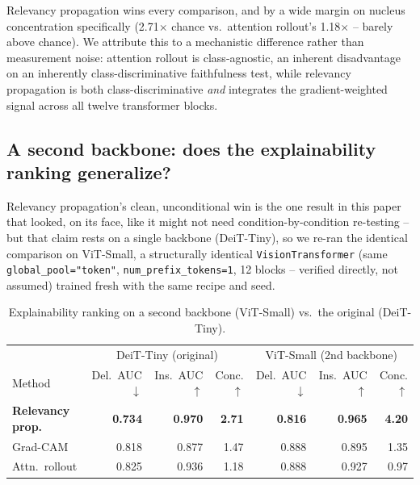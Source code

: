 \documentclass[runningheads]{llncs}
\begin{document}
Relevancy propagation wins every comparison, and by a wide margin on
nucleus concentration specifically (2.71$\times$ chance vs.\ attention
rollout's 1.18$\times$ -- barely above chance). We attribute this to a
mechanistic difference rather than measurement noise: attention rollout
is class-agnostic, an inherent disadvantage on an inherently
class-discriminative faithfulness test, while relevancy propagation is
both class-discriminative \emph{and} integrates the gradient-weighted
signal across all twelve transformer blocks.

\subsection{A second backbone: does the explainability ranking generalize?}

Relevancy propagation's clean, unconditional win is the one result in
this paper that looked, on its face, like it might not need
condition-by-condition re-testing -- but that claim rests on a single
backbone (DeiT-Tiny), so we re-ran the identical comparison on ViT-Small,
a structurally identical \texttt{VisionTransformer} (same
\texttt{global\_pool="token"}, \texttt{num\_prefix\_tokens=1}, 12 blocks
-- verified directly, not assumed) trained fresh with the same recipe and
seed.

\begin{table}[htbp]
\centering
\caption{Explainability ranking on a second backbone (ViT-Small) vs.\ the original (DeiT-Tiny).}
\label{tab:rq3-vit-small}
\begin{tabular}{lrrrrrr}
\toprule
 & \multicolumn{3}{c}{DeiT-Tiny (original)} & \multicolumn{3}{c}{ViT-Small (2nd backbone)} \\
Method & Del.\ AUC$\downarrow$ & Ins.\ AUC$\uparrow$ & Conc.$\uparrow$ & Del.\ AUC$\downarrow$ & Ins.\ AUC$\uparrow$ & Conc.$\uparrow$ \\
\midrule
\textbf{Relevancy prop.} & \textbf{0.734} & \textbf{0.970} & \textbf{2.71} & \textbf{0.816} & \textbf{0.965} & \textbf{4.20} \\
Grad-CAM & 0.818 & 0.877 & 1.47 & 0.888 & 0.895 & 1.35 \\
Attn.\ rollout & 0.825 & 0.936 & 1.18 & 0.888 & 0.927 & 0.97 \\
\bottomrule
\end{tabular}
\end{table}
\end{document}
